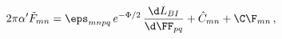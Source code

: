 \begin{equation}
2\pi\alpha'{\tilde F}_{mn} = 
  \eps_{mnpq}\,e^{-\Phi/2}\,\frac{\d L_{BI}}{\d\FF_{pq}}
   + \hat{C}_{mn} + \C\F_{mn}\,,
\end{equation}

